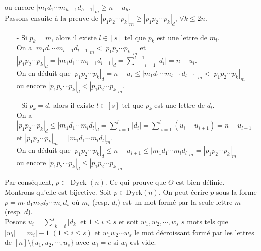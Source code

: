 ou encore $| m_{1}d_{1}\cdots m_{h-1}d_{h-1} |_{m}\geq n-u_{h}$.\\
Passons ensuite à la preuve de $|p_{1}p_{2}\cdots p_{k}|_{m}\geq |p_{1}p_{2}\cdots p_{k}|_{d}$, $\forall k\leq 2n$.
\begin{itemize}
	\item [-] Si $p_{k}=m$, alors il existe $l\in [s]$ tel que $p_{k}$ est une lettre de $m_{l}$.\\ On a $|m_{1}d_{1}\cdots m_{l-1}d_{l-1}|_{m}<|p_{1}p_{2}\cdots p_{k}|_{m}$ et $|p_{1}p_{2}\cdots p_{k}|_{d}=|m_{1}d_{1}\cdots m_{l-1}d_{l-1}|_{d}=\underset{i=1}{\overset{l-1}{\sum}}|d_{i}|=n-u_{l}$.\\
	      On en déduit que $|p_{1}p_{2}\cdots p_{k}|_{d}=n-u_{l}\leq | m_{1}d_{1}\cdots m_{l-1}d_{l-1} |_{m} <|p_{1}p_{2}\cdots p_{k}|_{m}$ \\ ou encore $|p_{1}p_{2}\cdots p_{k}|_{d}<|p_{1}p_{2}\cdots p_{k}|_{m}$.

	\item [-] Si $p_{k}=d$, alors il existe $l\in[s]$ tel que $p_{k}$ est une lettre de $d_{l}$.\\ On a $|p_{1}p_{2}\cdots p_{k}|_{d}\leq |m_{1}d_{1}\cdots m_{l}d_{l}|_{d}=\underset{i=1}{\overset{l}{\sum}}|d_{i}|= \underset{i=1}{\overset{l}{\sum}}(u_{i}-u_{i+1})=n-u_{l+1}$ et $|p_{1}p_{2}\cdots p_{k}|_{m}=|m_{1}d_{1}\cdots m_{l}d_{l}|_{m}$.\\
	      On en déduit que $|p_{1}p_{2}\cdots p_{k}|_{d}\leq n-u_{l+1} \leq |m_{1}d_{1}\cdots m_{l}d_{l}|_{m} =|p_{1}p_{2}\cdots p_{k}|_{m}$ \\ou encore $|p_{1}p_{2}\cdots p_{k}|_{d} \leq|p_{1}p_{2}\cdots p_{k}|_{m}$\vspace{7pt}
\end{itemize}
Par conséquent, $p\in \text{ Dyck }(n)$. Ce qui prouve que $\Theta$ est bien définie.\vspace{10pt}\\
Montrons qu'elle est bijective. Soit $p\in \text{Dyck}(n)$. On peut écrire $p$ sous la forme $p=m_{1}d_{1}m_{2}d_{2}\cdots m_{s}d_{s}$ où $m_{i}$ (resp. $d_{i}$) est un mot formé par la seule lettre $m$ (resp. $d$).\\
Posons $u_{i}=\underset{k=i}{\overset{s}{\sum}}|d_{k}|$ et $1\leq i \leq s$ et soit $w_{1}, w_{2}, \cdots, w_{s}$ $s$ mots tels que $|w_{i}| = |m_{i}| - 1$ $(1\leq i \leq s)$ et $w_{1}w_{2}\cdots w_{s}$ le mot décroissant formé par les lettres de $[n]\setminus \{u_1, u_{2}, \cdots, u_{s}\}$ avec $w_i = e$ si $w_i$ est vide.\\
